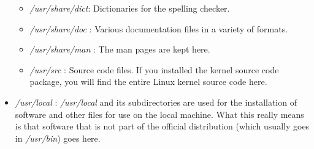\documentclass[10pt,letterpaper]{book}
\begin{document}
\begin{itemize}
\begin{itemize}
\item \textit{/usr/share/dict}: Dictionaries for the spelling checker.
\item \textit{/usr/share/doc} : Various documentation files in a variety of formats.
\item \textit{/usr/share/man} : The man pages are kept here.
\item \textit{/usr/src} : Source code files. If you installed the kernel source code package, you will find the entire Linux kernel source code here.
\end{itemize}
\item \textit{/usr/local} : \textit{/usr/local} and its subdirectories are used for the installation of software and other files for use on the local machine. What this really means is that software that is not part of the official distribution (which usually goes in \textit{/usr/bin}) goes here.


\end{itemize}
\end{document}

